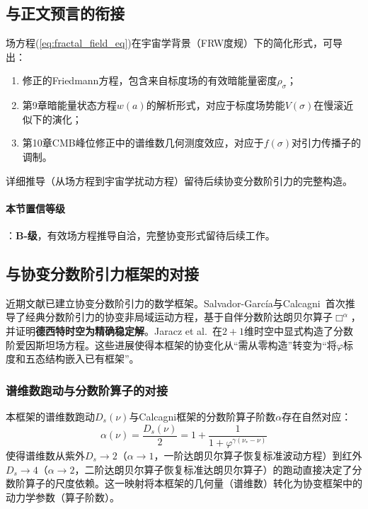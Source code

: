 \documentclass[12pt,a4paper,twocolumn]{article}
\renewcommand{\phi}{\varphi}
\begin{document}
\subsection{与正文预言的衔接}
场方程(\ref{eq:fractal_field_eq})在宇宙学背景（FRW度规）下的简化形式，可导出：
\begin{enumerate}
\item 修正的Friedmann方程，包含来自标度场的有效暗能量密度$\rho_\sigma$；
\item 第9章暗能量状态方程$w(a)$的解析形式，对应于标度场势能$V(\sigma)$在慢滚近似下的演化；
\item 第10章CMB峰位修正中的谱维数几何测度效应，对应于$f(\sigma)$对引力传播子的调制。
\end{enumerate}
详细推导（从场方程到宇宙学扰动方程）留待后续协变分数阶引力的完整构造。

\paragraph{本节置信等级}：\textbf{B-级}，有效场方程推导自洽，完整协变形式留待后续工作。

\subsection{与协变分数阶引力框架的对接}
\label{subsec:covariant_docking}

近期文献已建立协变分数阶引力的数学框架。Salvador-Garc\'ia与Calcagni~\cite{SalvadorGarcia2026}首次推导了经典分数阶引力的协变非局域运动方程，基于自伴分数阶达朗贝尔算子$\Box^\alpha$，并证明\textbf{德西特时空为精确稳定解}。Jaracz et al.~\cite{Jaracz2025}在$2{+}1$维时空中显式构造了分数阶爱因斯坦场方程。这些进展使得本框架的协变化从``需从零构造''转变为``将$\phi$标度和五态结构嵌入已有框架''。

\subsubsection{谱维数跑动与分数阶算子的对接}

本框架的谱维数跑动$D_s(\nu)$与Calcagni框架的分数阶算子阶数$\alpha$存在自然对应：
\begin{equation}
\alpha(\nu) = \frac{D_s(\nu)}{2} = 1 + \frac{1}{1+\phi^{\gamma(\nu_* - \nu)}}
\label{eq:alpha_nu_mapping}
\end{equation}
使得谱维数从紫外$D_s\to 2$（$\alpha\to 1$，一阶达朗贝尔算子恢复标准波动方程）到红外$D_s\to 4$（$\alpha\to 2$，二阶达朗贝尔算子恢复标准达朗贝尔算子）的跑动直接决定了分数阶算子的尺度依赖。这一映射将本框架的几何量（谱维数）转化为协变框架中的动力学参数（算子阶数）。
\end{document}
